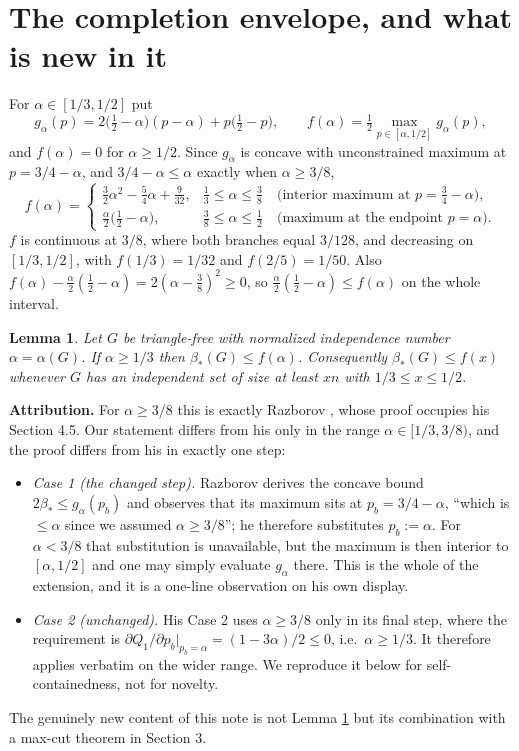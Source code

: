 \documentclass[11pt]{article}
\newtheorem{lemma}{Lemma}
\theoremstyle{remark}
\newcommand{\bh}{\beta_*}
\begin{document}
\section{The completion envelope, and what is new in it}
For $\alpha\in[1/3,1/2]$ put
\[
 g_\alpha(p)=2\big(\tfrac12-\alpha\big)(p-\alpha)+p\big(\tfrac12-p\big),
 \qquad
 f(\alpha)=\tfrac12\max_{p\in[\alpha,1/2]}g_\alpha(p),
\]
and $f(\alpha)=0$ for $\alpha\ge1/2$. Since $g_\alpha$ is concave with
unconstrained maximum at $p=3/4-\alpha$, and $3/4-\alpha\le\alpha$ exactly when
$\alpha\ge3/8$,
\begin{equation}\label{fdef}
 f(\alpha)=\begin{cases}
  \frac32\alpha^2-\frac54\alpha+\frac9{32}, & \tfrac13\le\alpha\le\tfrac38
    \quad\text{(interior maximum at }p=\tfrac34-\alpha),\\[2pt]
  \frac{\alpha}{2}\big(\frac12-\alpha\big), & \tfrac38\le\alpha\le\tfrac12
    \quad\text{(maximum at the endpoint }p=\alpha).
 \end{cases}
\end{equation}
$f$ is continuous at $3/8$, where both branches equal $3/128$, and decreasing
on $[1/3,1/2]$, with $f(1/3)=1/32$ and $f(2/5)=1/50$. Also
$f(\alpha)-\frac{\alpha}{2}(\frac12-\alpha)=2(\alpha-\frac38)^2\ge0$, so
$\frac{\alpha}{2}(\frac12-\alpha)\le f(\alpha)$ on the whole interval.

\begin{lemma}\label{ind}
Let $G$ be triangle-free with normalized independence number
$\alpha=\alpha(G)$. If $\alpha\ge1/3$ then $\bh(G)\le f(\alpha)$. Consequently
$\bh(G)\le f(x)$ whenever $G$ has an independent set of size at least $xn$
with $1/3\le x\le1/2$.
\end{lemma}

\noindent\textbf{Attribution.} For $\alpha\ge3/8$ this is exactly Razborov
\cite[Theorem 3.6]{raz}, whose proof occupies his Section 4.5. Our statement
differs from his only in the range $\alpha\in[1/3,3/8)$, and the proof differs
from his in exactly one step:
\begin{itemize}
\item \emph{Case 1 (the changed step).} Razborov derives the concave bound
$2\bh\le g_\alpha(p_b)$ and observes that its maximum sits at
$p_b=3/4-\alpha$, ``which is $\le\alpha$ since we assumed $\alpha\ge3/8$'';
he therefore substitutes $p_b:=\alpha$. For $\alpha<3/8$ that substitution is
unavailable, but the maximum is then interior to $[\alpha,1/2]$ and one may
simply evaluate $g_\alpha$ there. This is the whole of the extension, and it
is a one-line observation on his own display.
\item \emph{Case 2 (unchanged).} His Case 2 uses $\alpha\ge3/8$ only in its
final step, where the requirement is
$\partial Q_1/\partial p_b|_{p_b=\alpha}=(1-3\alpha)/2\le0$, i.e.\
$\alpha\ge1/3$. It therefore applies verbatim on the wider range. We reproduce
it below for self-containedness, not for novelty.
\end{itemize}
The genuinely new content of this note is not Lemma \ref{ind} but its
combination with a max-cut theorem in Section 3.
\end{document}
